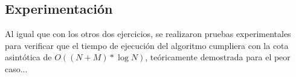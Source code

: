     


    \subsection{Experimentación}

        Al igual que con los otros dos ejercicios, se realizaron pruebas experimentales para verificar que el tiempo de ejecución del algoritmo cumpliera con la cota asintótica de $O((N+M) * \log N)$, teóricamente demostrada para el peor caso...